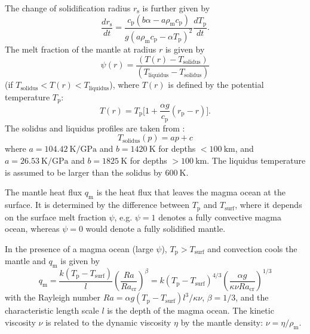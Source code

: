 \documentclass[oneside,twocolumn]{article}
\newcommand{\eg}{e.g. }
\begin{document}
The change of solidification radius $r_\mathrm{s}$ is further given by
\begin{equation}
	\label{Deriv_rsol}
	\frac{dr_\mathrm{s}}{dt} = \frac{c_\mathrm{p} (b \alpha - a \rho_\mathrm{m} c_\mathrm{p})}{g (a \rho_\mathrm{m} c_\mathrm{p} - \alpha T_\mathrm{p})^2} \frac{dT_\mathrm{p}}{dt}.
\end{equation}
The melt fraction of the mantle at radius $r$ is given by 
\begin{equation}
\psi (r) = \frac{(T(r) - T_\mathrm{solidus}) }{ ( T_\mathrm{liquidus} -  T_\mathrm{solidus}) }
\end{equation}
(if $T_\mathrm{solidus} < T(r) < T_\mathrm{liquidus}$), where $T(r)$ is defined by the potential temperature $T_\mathrm{p}$:
\begin{equation}
\label{adiabatic}
T(r) = T_\mathrm{p} \lbrack 1 + \frac{\alpha g}{c_\mathrm{p}} (r_\mathrm{p} - r) \rbrack.
\end{equation}
The solidus and liquidus profiles are taken from \citet{Hirschmann2000}:
\begin{equation}
    T_\mathrm{solidus}(p) = a p + c
\end{equation}
where $a = \SI{104.42}{\kelvin\per\giga\pascal}$ and $b = \SI{1420}{\kelvin}$ for depths ${< \SI{100}{\kilo\metre}}$, and $a = \SI{26.53}{\kelvin\per\giga\pascal}$ and $b = \SI{1825}{\kelvin}$ for depths ${> \SI{100}{\kilo\metre}}$.
The liquidus temperature is assumed to be larger than the solidus by $\SI{600}{\kelvin}$.

The mantle heat flux $q_\mathrm{m}$ is the heat flux that leaves the magma ocean at the surface. It is determined by the difference between $T_\mathrm{p}$ and $T_\mathrm{surf}$, where it depends on the surface melt fraction $\psi$, \eg $\psi=1$ denotes a fully convective magma ocean, whereas  $\psi=0$ would denote a fully solidified mantle.

In the presence of a magma ocean (large $\psi$), $T_\mathrm{p} > T_\mathrm{surf}$ and convection cools the mantle and $q_\mathrm{m}$ is given by
\begin{equation}
	\label{Eq_ManHeatFlux}
	q_\mathrm{m} = \frac{k (T_\mathrm{p} - T_\mathrm{surf})}{l} \left( \frac{Ra}{Ra_\mathrm{cr}}  \right)^\beta = k (T_\mathrm{p} - T_\mathrm{surf})^{4/3} \left( \frac{\alpha g}{\kappa \nu Ra_\mathrm{cr}} \right)^{1/3}
\end{equation}
with the Rayleigh number $Ra = \alpha g (T_\mathrm{p} - T_\mathrm{surf}) l^3 / \kappa \nu$, $\beta = 1/3$, and the characteristic length scale $l$ is the depth of the magma ocean. The kinetic viscosity $\nu$ is related to the dynamic viscosity $\eta$ by the mantle density: $\nu = \eta / \rho_\mathrm{m}$.
\end{document}
